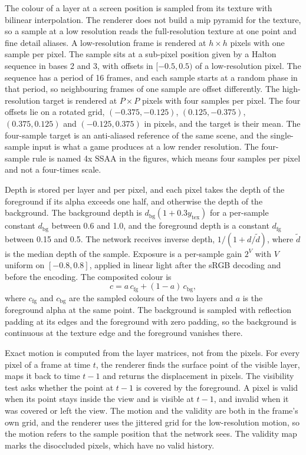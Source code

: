 The colour of a layer at a screen position is sampled from its texture with bilinear interpolation. The renderer does not build a mip pyramid for the texture, so a sample at a low resolution reads the full-resolution texture at one point and fine detail aliases. A low-resolution frame is rendered at $h\times h$ pixels with one sample per pixel. The sample sits at a sub-pixel position given by a Halton sequence \cite{halton1960efficiency} in bases 2 and 3, with offsets in $[-0.5,0.5)$ of a low-resolution pixel. The sequence has a period of 16 frames, and each sample starts at a random phase in that period, so neighbouring frames of one sample are offset differently. The high-resolution target is rendered at $P\times P$ pixels with four samples per pixel. The four offsets lie on a rotated grid, $(-0.375,-0.125)$, $(0.125,-0.375)$, $(0.375,0.125)$ and $(-0.125,0.375)$ in pixels, and the target is their mean. The four-sample target is an anti-aliased reference of the same scene, and the single-sample input is what a game produces at a low render resolution. The four-sample rule is named 4x SSAA in the figures, which means four samples per pixel and not a four-times scale.

Depth is stored per layer and per pixel, and each pixel takes the depth of the foreground if its alpha exceeds one half, and otherwise the depth of the background. The background depth is $d_{\mathrm{bg}}(1+0.3y_{\mathrm{tex}})$ for a per-sample constant $d_{\mathrm{bg}}$ between 0.6 and 1.0, and the foreground depth is a constant $d_{\mathrm{fg}}$ between 0.15 and 0.5. The network receives inverse depth, $1/(1+d/\tilde d)$, where $\tilde d$ is the median depth of the sample. Exposure is a per-sample gain $2^{V}$ with $V$ uniform on $[-0.8,0.8]$, applied in linear light after the sRGB decoding and before the encoding. The composited colour is
\begin{equation}
c=a\,c_{\mathrm{fg}}+(1-a)\,c_{\mathrm{bg}},\label{eq:data-composite}
\end{equation}
where $c_{\mathrm{fg}}$ and $c_{\mathrm{bg}}$ are the sampled colours of the two layers and $a$ is the foreground alpha at the same point. The background is sampled with reflection padding at its edges and the foreground with zero padding, so the background is continuous at the texture edge and the foreground vanishes there.

Exact motion is computed from the layer matrices, not from the pixels. For every pixel of a frame at time $t$, the renderer finds the surface point of the visible layer, maps it back to time $t-1$ and returns the displacement in pixels. The visibility test asks whether the point at $t-1$ is covered by the foreground. A pixel is valid when its point stays inside the view and is visible at $t-1$, and invalid when it was covered or left the view. The motion and the validity are both in the frame's own grid, and the renderer uses the jittered grid for the low-resolution motion, so the motion refers to the sample position that the network sees. The validity map marks the disoccluded pixels, which have no valid history.

